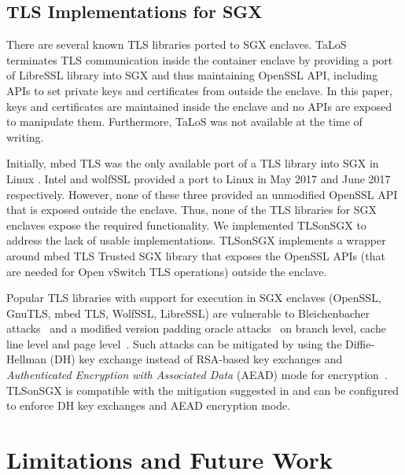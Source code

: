 {\subsection{TLS Implementations for SGX}
\label{subsec:tls-for-sgx}
There are several known TLS libraries ported to SGX enclaves.
TaLoS~\cite{aublin:2017} terminates TLS communication inside the container enclave by providing a port of LibreSSL library into SGX and thus maintaining OpenSSL API, including APIs to set private keys and certificates from outside the enclave. 
In this paper, keys and certificates are maintained inside the enclave and no APIs are exposed to manipulate them.
Furthermore, TaLoS %
was not available at the time of writing.

Initially, mbed TLS was the only available port of a TLS library into SGX in Linux \cite{mbedtls_sgx}. %
Intel \cite{sgxssl} and wolfSSL \cite{wolfSSL} provided a port to Linux in May 2017 and June 2017 respectively. 
However, none of these three provided an unmodified OpenSSL API that is exposed outside the enclave.
Thus, none of the TLS libraries for SGX enclaves expose the required functionality.
We implemented TLSonSGX to address the lack of usable implementations. 
TLSonSGX implements a wrapper around mbed TLS Trusted SGX library that exposes the OpenSSL APIs (that are needed for Open vSwitch TLS operations) outside the enclave.

\label{subsec:attacks-on-tls-sgx}
Popular TLS libraries with support for execution in SGX enclaves (OpenSSL, GnuTLS, mbed TLS, WolfSSL, LibreSSL) are vulnerable to Bleichenbacher attacks~\cite{bleichenbacher:1998} and a modified version padding oracle attacks~\cite{vaudenay:2002} on branch level, cache line level and page level~\cite{xiao:2017}.
Such attacks can be mitigated by using the Diffie-Hellman (DH) key exchange instead of RSA-based key exchanges and \textit{Authenticated Encryption with Associated Data} (AEAD) mode for encryption~\cite{xiao:2017}.
TLSonSGX is compatible with the mitigation suggested in \cite{xiao:2017} and can be configured to enforce DH key exchanges and AEAD encryption mode.


\section{Limitations and Future Work}
\label{sec:future_work}

}

